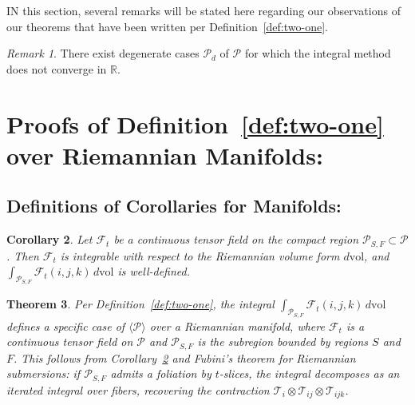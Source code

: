 \documentclass[10pt]{article}
\theoremstyle{plain}
\newtheorem{theorem}{Theorem}[section]
\newtheorem{corollary}[theorem]{Corollary}
\theoremstyle{definition}
\theoremstyle{remark}
\newtheorem{remark}[theorem]{Remark}
\begin{document}
\lettrine[lines=1, lhang=0.1, loversize=0.2]{I}N this section, several remarks will be stated here regarding our observations of our theorems that have been written per Definition~\ref{def:two-one}.

\begin{remark}
\label{remark:one}
  There exist degenerate cases $\mathcal{P}_d$ of $\mathcal{P}$ for which the integral method does not converge in $\mathbb{R}$.
\end{remark}

\section{Proofs of Definition~\ref{def:two-one} over Riemannian Manifolds:}

\subsection{Definitions of Corollaries for Manifolds:}

\begin{corollary}
\label{cor:integrability}
  Let $\mathcal{F}_t$ be a continuous tensor field on the compact region $\mathcal{P}_{S,F} \subset \mathcal{P}$. Then $\mathcal{F}_t$ is integrable with respect to the Riemannian volume form $d\mathrm{vol}$, and $\int_{\mathcal{P}_{S,F}} \mathcal{F}_t(i,j,k)\,d\mathrm{vol}$ is well-defined.
\end{corollary}

\begin{theorem}
\label{theo:one}
  Per Definition~\ref{def:two-one}, the integral $\int_{\mathcal{P}_{S,F}} \mathcal{F}_t(i, j, k)\,d\mathrm{vol}$ defines a specific case of $\langle \mathcal{P} \rangle$ over a Riemannian manifold, where $\mathcal{F}_t$ is a continuous tensor field on $\mathcal{P}$ and $\mathcal{P}_{S,F}$ is the subregion bounded by regions $S$ and $F$. This follows from Corollary~\ref{cor:integrability} and Fubini's theorem for Riemannian submersions: if $\mathcal{P}_{S,F}$ admits a foliation by $t$-slices, the integral decomposes as an iterated integral over fibers, recovering the contraction $\mathcal{T}_i \otimes \mathcal{T}_{ij} \otimes \mathcal{T}_{ijk}$.
\end{theorem}
\end{document}
